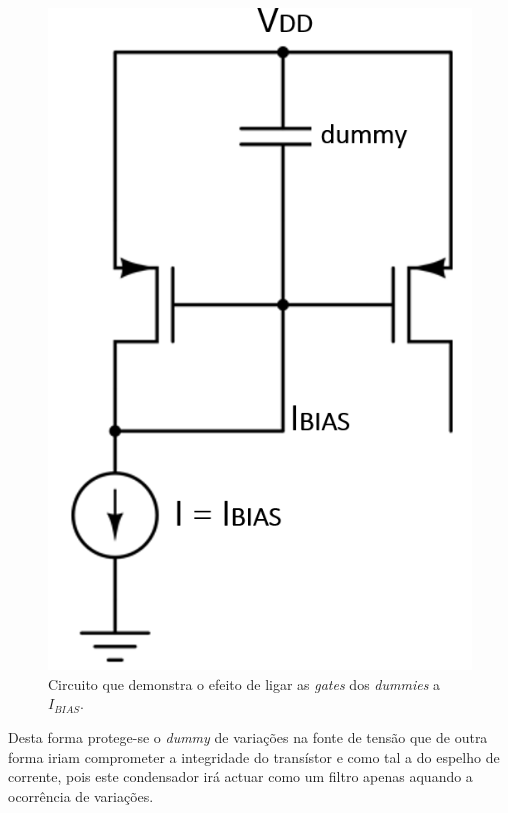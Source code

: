 \documentclass[11pt]{article}
\numberwithin{equation}{section}
\begin{document}
\begin{figure}[H]
	\centering
	\includegraphics[keepaspectratio=true, scale=0.45]{teoricas/circuito_ibias}
	\vspace{-0.5em}
	\caption{Circuito que demonstra o efeito de ligar as \textit{gates} dos \textit{dummies} a $I_{BIAS}$.}
	\vspace{-0.8em}
\end{figure}

Desta forma protege-se o \textit{dummy} de variações na fonte de tensão que de outra forma iriam comprometer a integridade do transístor e como tal a do espelho de corrente, pois este condensador irá actuar como um filtro apenas aquando a ocorrência de variações.
\end{document}

